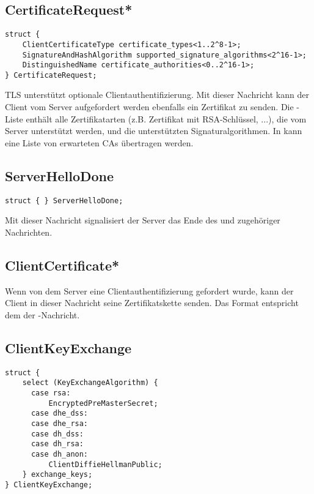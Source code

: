 \subsection*{CertificateRequest*}

\begin{lstlisting}
struct {
	ClientCertificateType certificate_types<1..2^8-1>;
	SignatureAndHashAlgorithm supported_signature_algorithms<2^16-1>;
	DistinguishedName certificate_authorities<0..2^16-1>;
} CertificateRequest;
\end{lstlisting}

TLS unterstützt optionale Clientauthentifizierung. Mit dieser Nachricht kann der Client vom Server aufgefordert werden ebenfalls ein Zertifikat zu senden. Die -Liste enthält alle Zertifikatarten (z.B. Zertifikat mit RSA-Schlüssel, ...), die vom Server unterstützt werden, und  die unterstützten Signaturalgorithmen. In  kann eine Liste von erwarteten CAs übertragen werden.

\subsection*{ServerHelloDone}

\begin{lstlisting}
struct { } ServerHelloDone;
\end{lstlisting}

Mit dieser Nachricht signalisiert der Server das Ende des \serverhello{} und zugehöriger Nachrichten.

\subsection*{ClientCertificate*}

Wenn von dem Server eine Clientauthentifizierung gefordert wurde, kann der Client in dieser Nachricht seine Zertifikatskette senden. Das Format entspricht dem der \servercertificate{}-Nachricht.

\subsection*{ClientKeyExchange}

\begin{lstlisting}
struct {
	select (KeyExchangeAlgorithm) {
	  case rsa:
	      EncryptedPreMasterSecret;
	  case dhe_dss:
	  case dhe_rsa:
	  case dh_dss:
	  case dh_rsa:
	  case dh_anon:
	      ClientDiffieHellmanPublic;
	} exchange_keys;
} ClientKeyExchange;
\end{lstlisting}

